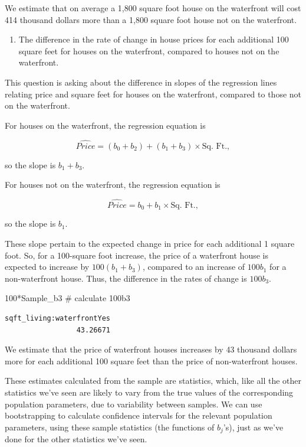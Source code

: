 \documentclass[
  letterpaper,
  DIV=11,
  numbers=noendperiod]{scrreprt}
\newenvironment{Shaded}{\begin{snugshade}}{\end{snugshade}}
\newcommand{\CommentTok}[1]{\textcolor[rgb]{0.37,0.37,0.37}{#1}}
\newcommand{\DecValTok}[1]{\textcolor[rgb]{0.68,0.00,0.00}{#1}}
\newcommand{\NormalTok}[1]{\textcolor[rgb]{0.00,0.23,0.31}{#1}}
\newcommand{\SpecialCharTok}[1]{\textcolor[rgb]{0.37,0.37,0.37}{#1}}
\providecommand{\tightlist}{%
  \setlength{\itemsep}{0pt}\setlength{\parskip}{0pt}}\usepackage{longtable,booktabs,array}
\begin{document}
We estimate that on average a 1,800 square foot house on the waterfront
will cost 414 thousand dollars more than a 1,800 square foot house not
on the waterfront.

\begin{enumerate}
\def\labelenumi{\arabic{enumi}.}
\setcounter{enumi}{3}
\tightlist
\item
  The difference in the rate of change in house prices for each
  additional 100 square feet for houses on the waterfront, compared to
  houses not on the waterfront.
\end{enumerate}

This question is asking about the difference in slopes of the regression
lines relating price and square feet for houses on the waterfront,
compared to those not on the waterfront.

For houses on the waterfront, the regression equation is

\[ \widehat{Price} = (b_0 + b_2) + (b_1 +b_3)\times\text{Sq. Ft.}, \]

so the slope is \(b_1 + b_3\).

For houses not on the waterfront, the regression equation is

\[ \widehat{Price} = b_0 + b_1 \times\text{Sq. Ft.}, \]

so the slope is \(b_1\).

These slope pertain to the expected change in price for each additional
1 square foot. So, for a 100-square foot increase, the price of a
waterfront house is expected to increase by \(100(b_1+b_3)\), compared
to an increase of \(100b_1\) for a non-waterfront house. Thus, the
difference in the rates of change is \(100b_3\).

\begin{Shaded}
\begin{Highlighting}[]
\DecValTok{100}\SpecialCharTok{*}\NormalTok{Sample\_b3 }\CommentTok{\# calculate 100b3}
\end{Highlighting}
\end{Shaded}

\begin{verbatim}
sqft_living:waterfrontYes 
                 43.26671 
\end{verbatim}

We estimate that the price of waterfront houses increases by 43 thousand
dollars more for each additional 100 square feet than the price of
non-waterfront houses.

These estimates calculated from the sample are statistics, which, like
all the other statistics we've seen are likely to vary from the true
values of the corresponding population parameters, due to variability
between samples. We can use bootstrapping to calculate confidence
intervals for the relevant population parameters, using these sample
statistics (the functions of \(b_j\)'s), just as we've done for the
other statistics we've seen.
\end{document}
